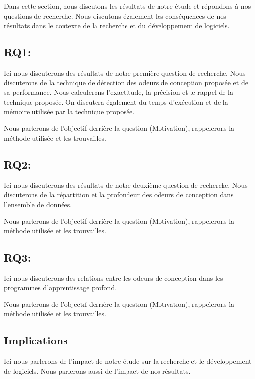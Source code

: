 \label{sec:discussion}
Dans cette section, nous discutons les résultats de notre étude et répondons à
nos questions de recherche. Nous discutons également les conséquences de nos
résultats dans le contexte de la recherche et du développement de logiciels.

\subsection{RQ1:\RQOne}
\label{rq1}

Ici nous discuterons des résultats de notre première question de recherche. Nous
discuterons de la technique de détection des odeurs de conception proposée et de
sa performance. Nous calculerons l'exactitude, la précision et le rappel de la technique
proposée. On discutera également du temps d'exécution et de la mémoire utilisée
par la technique proposée.

Nous parlerons de l'objectif derrière la question (Motivation), rappelerons la
méthode utilisée et les trouvailles.





\subsection{RQ2:\RQTwo}
\label{rq2}

Ici nous discuterons des résultats de notre deuxième question de recherche. Nous
discuterons de la répartition et la profondeur des odeurs de conception dans
l'ensemble de données.


Nous parlerons de l'objectif derrière la question (Motivation), rappelerons la
méthode utilisée et les trouvailles.



\subsection{RQ3:\RQThree}
\label{rq3}

Ici nous discuterons des relations entre les odeurs de conception dans les
programmes d'apprentissage profond.

Nous parlerons de l'objectif derrière la question (Motivation), rappelerons la
méthode utilisée et les trouvailles.






\subsection{Implications}
\label{implications}
Ici nous parlerons de l'impact de notre étude sur la recherche et le
développement de logiciels. Nous parlerons aussi de l'impact de nos résultats.




